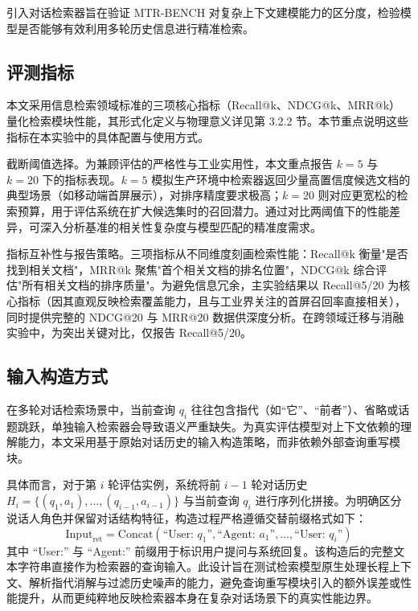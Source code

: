 引入对话检索器旨在验证 MTR-BENCH 对复杂上下文建模能力的区分度，检验模型是否能够有效利用多轮历史信息进行精准检索。




\subsection{评测指标}
\label{subsec:metrics_config}

本文采用信息检索领域标准的三项核心指标（Recall@k、NDCG@k、MRR@k）量化检索模块性能，其形式化定义与物理意义详见第 3.2.2 节。本节重点说明这些指标在本实验中的具体配置与使用方式。

截断阈值选择。为兼顾评估的严格性与工业实用性，本文重点报告 $k=5$ 与 $k=20$ 下的指标表现。$k=5$ 模拟生产环境中检索器返回少量高置信度候选文档的典型场景（如移动端首屏展示），对排序精度要求极高；$k=20$ 则对应更宽松的检索预算，用于评估系统在扩大候选集时的召回潜力。通过对比两阈值下的性能差异，可深入分析基准的相关性复杂度与模型匹配的精准度需求。

指标互补性与报告策略。三项指标从不同维度刻画检索性能：Recall@k 衡量"是否找到相关文档"，MRR@k 聚焦"首个相关文档的排名位置"，NDCG@k 综合评估"所有相关文档的排序质量"。为避免信息冗余，主实验结果以 Recall@5/20 为核心指标（因其直观反映检索覆盖能力，且与工业界关注的首屏召回率直接相关），同时提供完整的 NDCG@20 与 MRR@20 数据供深度分析。在跨领域迁移与消融实验中，为突出关键对比，仅报告 Recall@5/20。







\subsection{输入构造方式}

在多轮对话检索场景中，当前查询 $q_i$ 往往包含指代（如“它”、“前者”）、省略或话题跳跃，单独输入检索器会导致语义严重缺失。为真实评估模型对上下文依赖的理解能力，本文采用基于原始对话历史的输入构造策略，而非依赖外部查询重写模块。

具体而言，对于第 $i$ 轮评估实例，系统将前 $i-1$ 轮对话历史 $H_i = \{(q_1, a_1), \dots, (q_{i-1}, a_{i-1})\}$ 与当前查询 $q_i$ 进行序列化拼接。为明确区分说话人角色并保留对话结构特征，构造过程严格遵循交替前缀格式如下：
\begin{equation}
    \text{Input}_{\text{ret}} = \text{Concat}(\text{``User: } q_1 \text{''}, \text{``Agent: } a_1 \text{''}, \dots, \text{``User: } q_i \text{''})
\end{equation}
其中 ``User:'' 与 ``Agent:'' 前缀用于标识用户提问与系统回复。该构造后的完整文本字符串直接作为检索器的查询输入。此设计旨在测试检索模型原生处理长程上下文、解析指代消解与过滤历史噪声的能力，避免查询重写模块引入的额外误差或性能提升，从而更纯粹地反映检索器本身在复杂对话场景下的真实性能边界。


